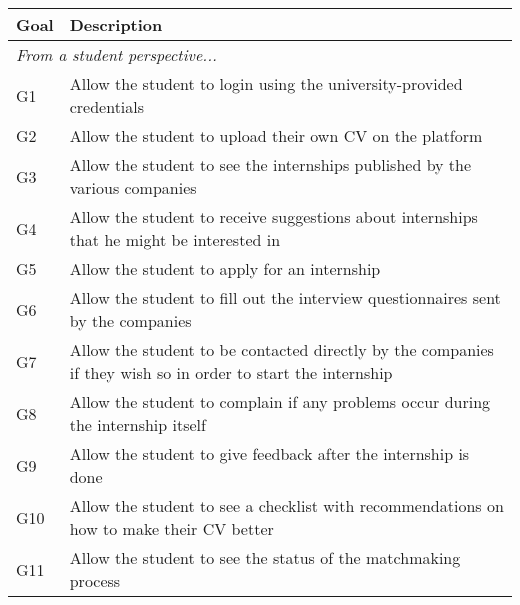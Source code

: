 \begin{table}[H]
    \centering
    \begin{longtable}{|l|p{}|}
        \hline
        \textbf{Goal} & \textbf{Description}                                                                                         \\
        \hline
        \multicolumn{2}{|l|}{\textit{From a student perspective...}}                                                                 \\
        \hline
        G1            & Allow the student to login using the university-provided credentials                                         \\
        \hline
        G2            & Allow the student to upload their own CV on the platform                                                     \\
        \hline
        G3            & Allow the student to see the internships published by the various companies                                  \\
        \hline
        G4            & Allow the student to receive suggestions about internships that he might be interested in                    \\
        \hline
        G5            & Allow the student to apply for an internship                                                                 \\
        \hline
        G6            & Allow the student to fill out the interview questionnaires sent by the companies                             \\
        \hline
        G7            & Allow the student to be contacted directly by the companies if they wish so in order to start the internship \\
        \hline
        G8            & Allow the student to complain if any problems occur during the internship itself                             \\
        \hline
        G9            & Allow the student to give feedback after the internship is done                                              \\
        \hline
        G10           & Allow the student to see a checklist with recommendations on how to make their CV better                     \\
        \hline
        G11           & Allow the student to see the status of the matchmaking process                                               \\

\end{longtable}
\end{table}
